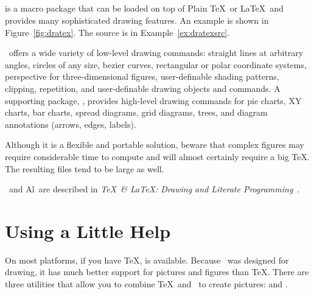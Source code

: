 

\subsection{\protect\DraTeX}

 is a 
macro package that can be loaded on top of Plain \TeX\ or
\LaTeX\ and provides many sophisticated drawing features.  An example is shown
in Figure~\ref{fig:dratex}. The source is in Example~\ref{ex:dratexsrc}.


\newpage
{}

\DraTeX\ offers a wide variety of low-level drawing commands: straight lines at
arbitrary angles, circles of any size, bezier curves, rectangular or polar
coordinate systems, perspective for three-dimensional figures, user-definable
shading patterns, clipping, repetition, and user-definable drawing objects and
commands.  A supporting package, \ixx{Al\DraTeX}{AlDraTeX@Al\DraTeX}, provides high-level drawing
commands for pie charts, XY charts, bar charts, spread diagrams, grid
diagrams, trees, and diagram annotations (arrows, edges, labels).

Although it is a flexible and portable solution, beware that complex figures
may require considerable time to compute and will almost certainly require
a big \TeX.  The resulting \ext{DVI} files tend to be large as well.

\DraTeX\ and Al\DraTeX\ are described in \textit{\TeX\ \& \LaTeX:
Drawing and Literate Programming}~\cite{eg:dratex}.

\section{Using a Little Help}

On most platforms, if you 
have \TeX,  is 
available.  Because \MF\ was
designed for drawing, it has much better support for pictures and figures
than \TeX.  There are three utilities that allow you to combine \TeX\
and \MF\ to create pictures: \program{\MFPic} and \program{\FigMF}.

